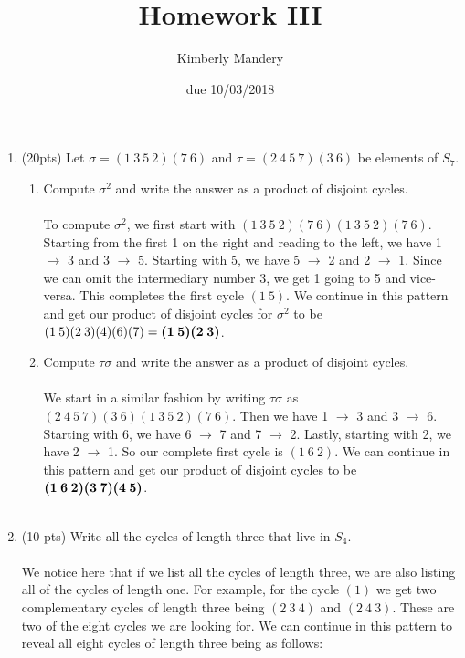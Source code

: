 \documentclass[16pt]{article}
\begin{document}
\title{Homework III}
\author{Kimberly Mandery}
\date{due 10/03/2018} 
\maketitle
\begin{enumerate}

\item(20pts) Let $\sigma = (1\:3\:5\:2)(7\:6)$ and $\tau = (2\:4\:5\:7)(3\:6)$ be elements of $S_7$.
\begin{enumerate}
\item Compute $\sigma ^2$ and write the answer as a product of disjoint cycles.\\\\
To compute $\sigma ^2$, we first start with 
$(1\:3\:5\:2)(7\:6)(1\:3\:5\:2)(7\:6)$.
Starting from the first 1 on the right and reading to the left, we have 1 $\to$ 3 and 3 $\to$ 5. Starting with 5, we have 5 $\to$ 2 and 2 $\to$ 1. Since we can omit the intermediary number 3, we get 1 going to 5 and vice-versa. This completes the first cycle $(1\:5)$.  We continue in this pattern and get our product of disjoint cycles for $\sigma ^2$ to be $(1\:5)(2\:3)(4)(6)(7)=\textbf{(1\:5)(2\:3)}$.\\ 
\item Compute $\tau \sigma $ and write the answer as a product of disjoint cycles.\\\\
We start in a similar fashion by writing $\tau \sigma$ as $(2\:4\:5\:7)(3\:6)(1\:3\:5\:2)(7\:6)$. Then we have 1 $\to$ 3 and 3 $\to$ 6. Starting with 6, we have 6 $\to$ 7 and 7 $\to$ 2. Lastly, starting with 2, we have 2 $\to$ 1. So our complete first cycle is $(1\:6\:2)$. We can continue in this pattern and get our product of disjoint cycles to be $\textbf{(1\:6\:2)(3\:7)(4\:5)}$.\\\\
\end{enumerate}
\item(10 pts) Write all the cycles of length three that live in $S_4$.\\\\
We notice here that if we list all the cycles of length three, we are also listing all of the cycles of length one. For example, for the cycle $(1)$ we get two complementary cycles of length three being $(2\:3\:4)$ and $(2\:4\:3)$. These are two of the eight cycles we are looking for. We can continue in this pattern to reveal all eight cycles of length three being as follows:\\ 


\end{enumerate}
\end{document}
